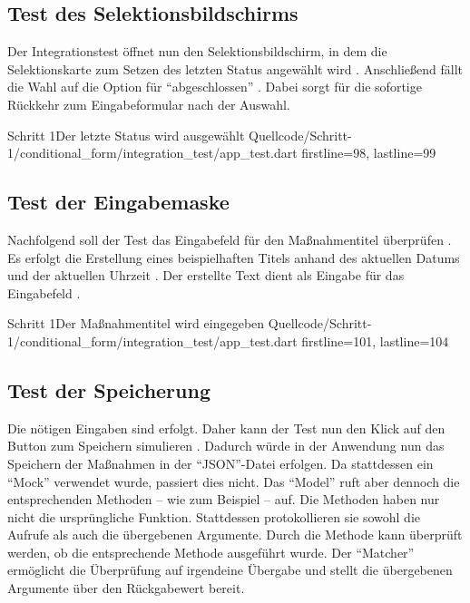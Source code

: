 \clearpage

\subsection{Test des Selektionsbildschirms}
\label{sec:TestDesSelektionsbildschirms}

Der Integrationstest öffnet nun den Selektionsbildschirm, in dem die Selektionskarte zum Setzen des letzten Status angewählt wird .
Anschließend fällt die Wahl auf die Option für \enquote{abgeschlossen} .
Dabei sorgt  für die sofortige Rückkehr zum Eingabeformular nach der Auswahl.
 
\begin{alexlisting}{Schritt 1}{Der letzte Status wird ausgewählt}
  {Quellcode/Schritt-1/conditional_form/integration_test/app_test.dart}
  {firstline=98, lastline=99}
  \label{lst:Schritt1LetzterStatusWirdAusgewählt}
\end{alexlisting}



\subsection{Test der Eingabemaske}
\label{sec:TestDerEingabemaske}

Nachfolgend soll der Test das Eingabefeld für den Maßnahmentitel überprüfen \Lst{\ref{lst:Schritt1MassnahmentitelWirdEingegeben}}.
Es erfolgt die Erstellung eines beispielhaften Titels anhand des aktuellen Datums und der aktuellen Uhrzeit .
Der erstellte Text dient als Eingabe für das Eingabefeld . 

\begin{alexlisting}{Schritt 1}{Der Maßnahmentitel wird eingegeben}
  {Quellcode/Schritt-1/conditional_form/integration_test/app_test.dart}
  {firstline=101, lastline=104}
  \label{lst:Schritt1MassnahmentitelWirdEingegeben}
\end{alexlisting}

\subsection{Test der Speicherung}
\label{sec:TestDerSpeicherung}

Die nötigen Eingaben sind erfolgt.
Daher kann der Test nun den Klick auf den Button zum Speichern simulieren .
Dadurch würde in der Anwendung nun das Speichern der Maßnahmen in der \enquote{JSON}-Datei erfolgen.
Da stattdessen ein \enquote{Mock} verwendet wurde, passiert dies nicht.
Das \enquote{Model} ruft aber dennoch die entsprechenden Methoden -- wie zum Beispiel  -- auf.
Die Methoden haben nur nicht die ursprüngliche Funktion.
Stattdessen protokollieren sie sowohl die Aufrufe als auch die übergebenen Argumente.
Durch die Methode   kann überprüft werden, ob die entsprechende Methode  ausgeführt wurde.
Der \enquote{Matcher}  ermöglicht die Überprüfung auf irgendeine Übergabe und stellt die übergebenen Argumente über den Rückgabewert bereit.

